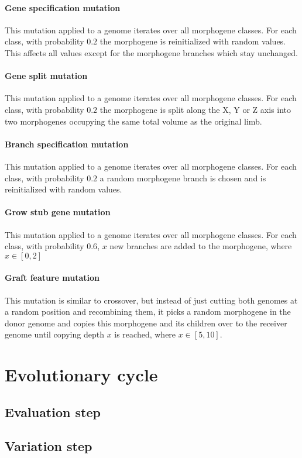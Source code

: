 \documentclass[main]{subfiles}
\begin{document}
\paragraph{Gene specification mutation}

This mutation applied to a genome iterates over all morphogene classes. For each class, with probability $0.2$ the morphogene is reinitialized with random values. This affects all values except for the morphogene branches which stay unchanged.

\paragraph{Gene split mutation}

This mutation applied to a genome iterates over all morphogene classes. For each class, with probability $0.2$ the morphogene is split along the X, Y or Z axis into two morphogenes occupying the same total volume as the original limb.

\paragraph{Branch specification mutation}

This mutation applied to a genome iterates over all morphogene classes. For each class, with probability $0.2$ a random morphogene branch is chosen and is reinitialized with random values. 

\paragraph{Grow stub gene mutation}

This mutation applied to a genome iterates over all morphogene classes. For each class, with probability $0.6$, $x$ new branches are added to the morphogene, where $x \in [0,2]$

\paragraph{Graft feature mutation}

This mutation is similar to crossover, but instead of just cutting both genomes at a random position and recombining them, it picks a random morphogene in the donor genome and copies this morphogene and its children over to the receiver genome until copying depth $x$ is reached, where $x \in [5,10]$.

\section{Evolutionary cycle}

\lipsum[16]

\subsection{Evaluation step}

\lipsum[17]

\subsection{Variation step}

\lipsum[18]
\end{document}
